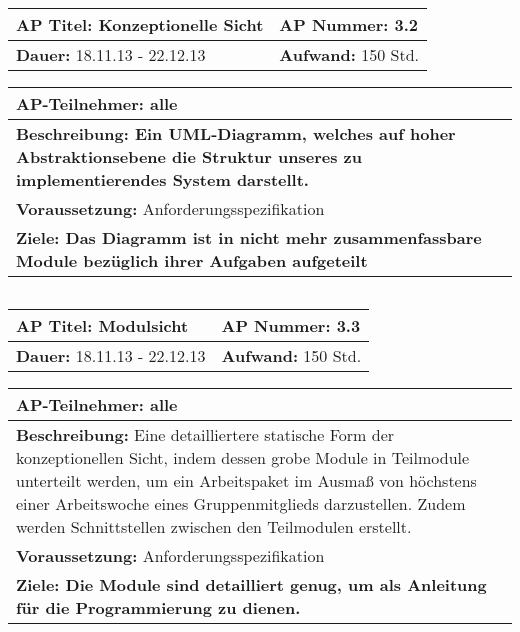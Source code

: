 \begin{tabular}{|p{7.43cm}|p{7.43cm}|}
\hline
\textbf{AP Titel: }Konzeptionelle Sicht & \textbf{AP Nummer: }3.2\\ 
\hline
\textbf{Dauer: }18.11.13 - 22.12.13& \textbf{Aufwand: }150 Std.\\
\hline
\end{tabular}
\begin{tabular}{|p{15.3cm}|}
\hline
\textbf{AP-Teilnehmer: }alle\\
\hline
\textbf{Beschreibung: Ein UML-Diagramm, welches auf hoher Abstraktionsebene
die Struktur unseres zu implementierendes System darstellt.}\\
\hline
\textbf{Voraussetzung: }Anforderungsspezifikation\\
\hline 
\textbf{Ziele: Das Diagramm ist in nicht mehr zusammenfassbare Module bezüglich ihrer
Aufgaben aufgeteilt}\\
\hline 
\end{tabular}
\begin{verbatim}

\end{verbatim}

\begin{tabular}{|p{7.43cm}|p{7.43cm}|}
\hline
\textbf{AP Titel: }Modulsicht & \textbf{AP Nummer: }3.3\\ 
\hline
\textbf{Dauer: }18.11.13 - 22.12.13& \textbf{Aufwand: }150 Std.\\
\hline
\end{tabular}
\begin{tabular}{|p{15.3cm}|}
\hline
\textbf{AP-Teilnehmer: }alle\\
\hline
\textbf{Beschreibung: }Eine detailliertere statische Form der konzeptionellen Sicht, indem dessen grobe Module in Teilmodule unterteilt werden, um ein Arbeitspaket im Ausmaß von höchstens einer Arbeitswoche eines Gruppenmitglieds darzustellen. Zudem werden Schnittstellen
zwischen den Teilmodulen erstellt. \\
\hline
\textbf{Voraussetzung: }Anforderungsspezifikation\\
\hline 
\textbf{Ziele: Die Module sind detailliert genug, um als Anleitung für die Programmierung
zu dienen.}\\
\hline 
\end{tabular}
\begin{verbatim}

\end{verbatim}

